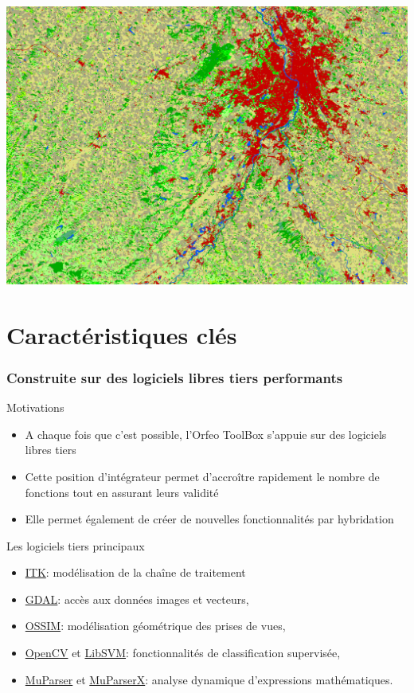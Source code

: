 \documentclass[8pt]{beamer}
\begin{document}
\vspace*{-6.5mm}
\begin{frame}[plain]
\hspace*{-11mm}
    \includegraphics[keepaspectratio,height=1.1\paperheight]{../../Courses/2016/WorkshopGuide/Images/final_classification.png}
\end{frame}

\section{Caractéristiques clés}

\begin{frame}
\frametitle{Construite sur des logiciels libres tiers performants}
\begin{block}{Motivations}
\begin{itemize}
\item A chaque fois que c'est possible, l'Orfeo ToolBox s'appuie sur des
  logiciels libres tiers
\item Cette position d'intégrateur permet d'accroître rapidement le nombre de fonctions tout en assurant leurs validité
\item Elle permet également de créer de nouvelles fonctionnalités par hybridation
\end{itemize}
\end{block}

\begin{block}{Les logiciels tiers principaux}
\begin{itemize}
\item \href{www.itk.org}{ITK}: modélisation de la chaîne de traitement
\item \href{www.gdal.org}{GDAL}: accès aux données images et vecteurs,
\item \href{www.ossim.org}{OSSIM}: modélisation géométrique des prises de vues,
\item \href{www.opencv.org}{OpenCV} et \href{www.libsvm.org}{LibSVM}: fonctionnalités de classification supervisée,
\item \href{www.muparser.org}{MuParser} et \href{www.muparserx.org}{MuParserX}:
analyse dynamique d'expressions mathématiques.
\end{itemize}
\end{block}


\end{frame}
\end{document}
